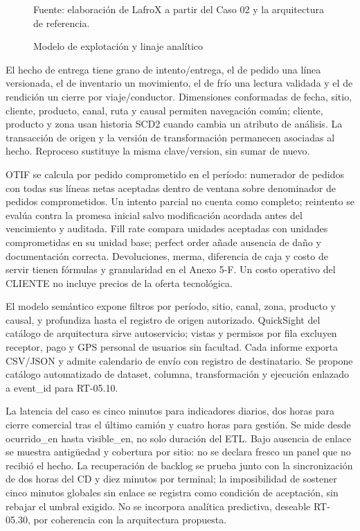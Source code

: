 \begin{figure}[htbp]
\centering

\caption{Modelo de explotación y linaje analítico}
\label{fig:5-analitica}
{\fontsize{9pt}{11pt}\selectfont Fuente: elaboración de LafroX a partir del Caso 02 y la arquitectura de referencia.}
\end{figure}\FloatBarrier

El hecho de entrega tiene grano de intento/entrega, el de pedido una línea versionada, el de inventario un movimiento, el de frío una lectura validada y el de rendición un cierre por viaje/conductor. Dimensiones conformadas de fecha, sitio, cliente, producto, canal, ruta y causal permiten navegación común; cliente, producto y zona usan historia SCD2 cuando cambia un atributo de análisis. La transacción de origen y la versión de transformación permanecen asociadas al hecho. Reproceso sustituye la misma clave/version, sin sumar de nuevo.

OTIF se calcula por pedido comprometido en el período: numerador de pedidos con todas sus líneas netas aceptadas dentro de ventana sobre denominador de pedidos comprometidos. Un intento parcial no cuenta como completo; reintento se evalúa contra la promesa inicial salvo modificación acordada antes del vencimiento y auditada. Fill rate compara unidades aceptadas con unidades comprometidas en su unidad base; perfect order añade ausencia de daño y documentación correcta. Devoluciones, merma, diferencia de caja y costo de servir tienen fórmulas y granularidad en el Anexo 5-F. Un costo operativo del CLIENTE no incluye precios de la oferta tecnológica.

El modelo semántico expone filtros por período, sitio, canal, zona, producto y causal, y profundiza hasta el registro de origen autorizado. QuickSight del catálogo de arquitectura sirve autoservicio; vistas y permisos por fila excluyen receptor, pago y GPS personal de usuarios sin facultad. Cada informe exporta CSV/JSON y admite calendario de envío con registro de destinatario. Se propone catálogo automatizado de dataset, columna, transformación y ejecución enlazado a event\_id para RT-05.10.

La latencia del caso es cinco minutos para indicadores diarios, dos horas para cierre comercial tras el último camión y cuatro horas para gestión. Se mide desde ocurrido\_en hasta visible\_en, no solo duración del ETL. Bajo ausencia de enlace se muestra antigüedad y cobertura por sitio: no se declara fresco un panel que no recibió el hecho. La recuperación de backlog se prueba junto con la sincronización de dos horas del CD y diez minutos por terminal; la imposibilidad de sostener cinco minutos globales sin enlace se registra como condición de aceptación, sin rebajar el umbral exigido. No se incorpora analítica predictiva, deseable RT-05.30, por coherencia con la arquitectura propuesta.


